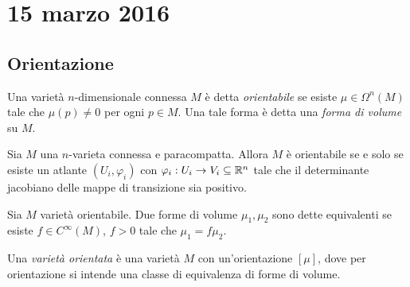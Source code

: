 \chapter{15 marzo 2016}




\section{Orientazione}

\begin{definition}  
	Una varietà $n$-dimensionale connessa $M$ è detta \emph{orientabile} se esiste $\mu\in\Omega^n(M)$ tale che $\mu(p)\not=0$ per ogni $p\in M$. Una tale forma è detta una \emph{forma di volume} su $M$.
\end{definition}

\begin{proposition}
	Sia $M$ una $n$-varieta connessa e paracompatta. Allora $M$ è orientabile se e solo se esiste un atlante $(U_i,\varphi_i)$ con $\varphi_i:U_i\to V_i\subseteq \mathbb R^n$ tale che il determinante jacobiano delle mappe di transizione sia positivo.
\end{proposition}

\begin{definition} 
	Sia $M$ varietà orientabile. Due forme di volume $\mu_1,\mu_2$ sono dette equivalenti se esiste $f\in C^\infty(M)$, $f>0$ tale che $\mu_1= f \mu_2$.
	
	Una \emph{varietà orientata} è una varietà $M$ con un'orientazione $[\mu]$, dove per orientazione si intende una classe di equivalenza di forme di volume.
\end{definition}

